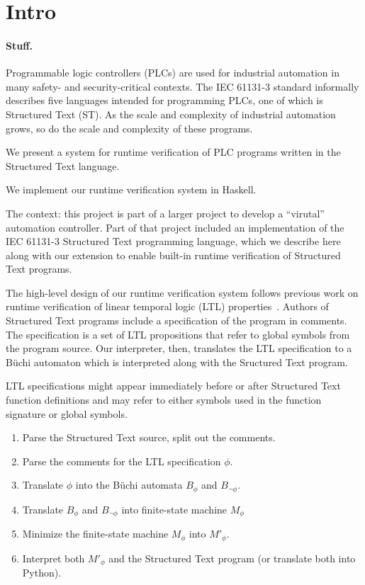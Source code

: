 % 

\section{Intro}

\paragraph{Stuff.}

Programmable logic controllers (PLCs) are used for industrial automation in many
safety- and security-critical contexts. The IEC 61131-3 standard informally
describes five languages intended for programming PLCs, one of which is
Structured Text (ST). As the scale and complexity of industrial automation grows, so
do the scale and complexity of these programs.

We present a system for runtime verification of PLC programs written in the
Structured Text language.

We implement our runtime verification system in Haskell.

The context: this project is part of a larger project to develop a ``virutal''
automation controller. Part of that project included an implementation of the
IEC 61131-3 Structured Text programming language, which we describe here along
with our extension to enable built-in runtime verification of Structured Text
programs.

The high-level design of our runtime verification system follows previous work
on runtime verification of linear temporal logic (LTL)
properties~\cite{bauer:rv_ltl}. Authors of Structured Text programs include a
specification of the program in comments. The specification is a set of LTL
propositions that refer to global symbols from the program source. Our
interpreter, then, translates the LTL specification to a B\"uchi automaton which
is interpreted along with the Sructured Text program.

LTL specifications might appear immediately before or after Structured Text
function definitions and may refer to either symbols used in the function
signature or global symbols.

\begin{enumerate}
\item Parse the Structured Text source, split out the comments.
\item Parse the comments for the LTL specification $\phi$.
\item Translate $\phi$ into the B\"uchi automata $B_\phi$ and $B_{\lnot\phi}$.
\item Translate $B_\phi$ and $B_{\lnot\phi}$ into finite-state machine $M_\phi$
\item Minimize the finite-state machine $M_\phi$ into $M'_\phi$.
\item Interpret both $M'_\phi$ and the Structured Text program (or translate
both into Python).
\end{enumerate}

